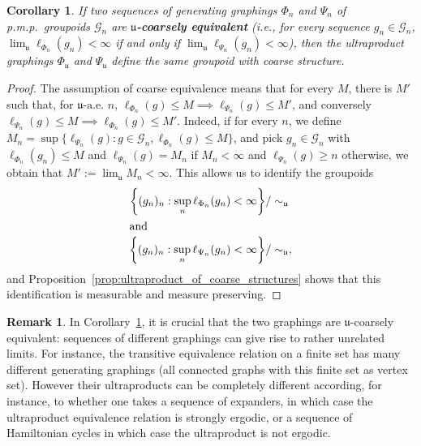\documentclass[10pt]{amsart}
\newtheorem{coro}[cdrthm]{Corollary}
\theoremstyle{definition}
\newtheorem{rema}[cdrthm]{Remark}
\newcommand{\defin}[1]{\textbf{\emph{#1}}}
\newcommand{\cg}{\mathcal{G}}
\newcommand{\ul}{\mathfrak{u}}
\newcommand{\ulae}{\mathfrak{u}\textrm{-a.e. }n}
\newcommand{\pmp}{p.m.p.\ }
\begin{document}
\begin{coro}\label{cor:dependance_en_graphage}
If two sequences of generating graphings $\Phi_n$ and $\Psi_n$ of \pmp groupoids $\cg_n$ are
\defin{$\ul$-coarsely equivalent} (i.e., for every sequence $g_n \in \cg_n$, $\lim_\ul \ell_{\Phi_n}(g_n) <\infty$ if and only if $\lim_\ul \ell_{\Psi_n}(g_n) <\infty$), then the ultraproduct graphings $\Phi_\ul$ and $\Psi_\ul$ define the same groupoid with coarse structure.
\end{coro}
\begin{proof}
The assumption of coarse equivalence means that for every $M$, there is $M'$ such that, for $\ulae$, $\ell_{\Phi_n}(g) \leq M \implies \ell_{\Psi_n}(g) \leq M'$, and conversely $\ell_{\Psi_n}(g) \leq M \implies \ell_{\Phi_n}(g) \leq M'$. Indeed, if for every $n$, we define $M_n = \sup\{ \ell_{\Psi_n}(g): g \in \cg_n, \ell_{\Phi_n}(g) \leq M\}$, and pick $g_n \in \cg_n$ with $\ell_{\Phi_n}(g_n) \leq M$ and $\ell_{\Psi_n}(g) = M_n$ if $M_n<\infty$ and $\ell_{\Psi_n}(g)\geq n$ otherwise, we obtain that $M':= \lim_\ul M_n <\infty$. This allows us to identify the groupoids
\pagebreak
\begin{align*}
\left\{ (g_n)_n : \sup_n \ell_{\Phi_n}(g_n) <\infty\right\} &/\sim_\ul
\\
\intertext{and}
\left\{ (g_n)_n : \sup_n \ell_{\Psi_n}(g_n) <\infty\right\} &/\sim_\ul,
\end{align*}
and Proposition~\ref{prop:ultraproduct_of_coarse_structures} shows that this identification is measurable and measure preserving.
\end{proof}

\begin{rema}
In Corollary~\ref{cor:dependance_en_graphage}, it is crucial that the two graphings are $\ul$-coarsely equivalent: sequences of different graphings can give rise to rather unrelated limits. For instance, the transitive equivalence relation on a finite set has many different generating graphings (all connected graphs with this finite set as vertex set). However their ultraproducts can be completely different according, for instance, to whether one takes a sequence of expanders, in which case the ultraproduct equivalence relation is strongly ergodic, or a sequence of Hamiltonian cycles in which case the ultraproduct is not ergodic.
\end{rema}
\end{document}
